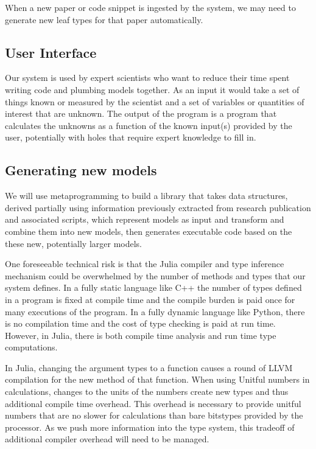 \documentclass{article}
\begin{document}
When a new paper or code snippet is ingested by the system, we may need to generate new leaf types for that paper automatically.

\subsection{User Interface}

Our system is used by expert scientists who want to reduce their time spent writing code and plumbing models together. As an input it would take a set of things known or measured by the scientist and a set of variables or quantities of interest that are unknown. The output of the program is a program that calculates the unknowns as a function of the known input(s) provided by the user, potentially with holes that require expert knowledge to fill in.

\subsection{Generating new models}
We will use metaprogramming to build a library that takes data structures, derived partially using information previously extracted from research publication and associated scripts, which represent models as input and transform and combine them into new models, then generates executable code based on the these new, potentially larger models.

One foreseeable technical risk is that the Julia compiler and type inference mechanism could be overwhelmed by the number of methods and types that our system defines. In a fully static language like C++ the number of types defined in a program is fixed at compile time and the compile burden is paid once for many executions of the program. In a fully dynamic language like Python, there is no compilation time and the cost of type checking is paid at run time. However, in Julia, there is both compile time analysis and run time type computations. 

In Julia, changing the argument types to a function causes a round of LLVM compilation for the new method of that function. When using Unitful numbers in calculations, changes to the units of the numbers create new types and thus additional compile time overhead. This overhead is necessary to provide unitful numbers that are no slower for calculations than bare bitstypes provided by the processor. As we push more information into the type system, this tradeoff of additional compiler overhead will need to be managed.
\end{document}
